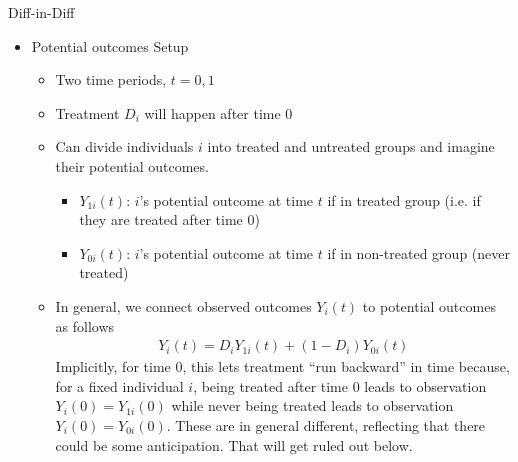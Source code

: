 \documentclass[12pt]{article}
\theoremstyle{plain}
\theoremstyle{definition}
\theoremstyle{remark}
\begin{document}
Diff-in-Diff
\begin{itemize}
  \item Potential outcomes Setup
    \begin{itemize}
      \item Two time periods, $t=0,1$
      \item Treatment $D_i$ will happen after time 0
      \item Can divide individuals $i$ into treated and untreated
        groups and imagine their potential outcomes.
        \begin{itemize}
          \item $Y_{1i}(t)$: $i$'s potential outcome at time $t$
            if in treated group (i.e. if they are treated after time
            $0$)
          \item $Y_{0i}(t)$: $i$'s potential outcome at time $t$
            if in non-treated group (never treated)
        \end{itemize}
      \item In general, we connect observed outcomes $Y_i(t)$ to
        potential outcomes as follows
        \begin{align*}
          Y_{i}(t) = D_iY_{1i}(t) + (1-D_i)Y_{0i}(t)
        \end{align*}
        Implicitly, for time $0$, this lets treatment ``run backward''
        in time because, for a fixed individual $i$, being treated after
        time 0 leads to observation $Y_i(0)=Y_{1i}(0)$ while never being
        treated leads to observation $Y_i(0)=Y_{0i}(0)$.
        These are in general different, reflecting that there could be
        some anticipation.
        That will get ruled out below.


\end{itemize}
\end{itemize}
\end{document}
